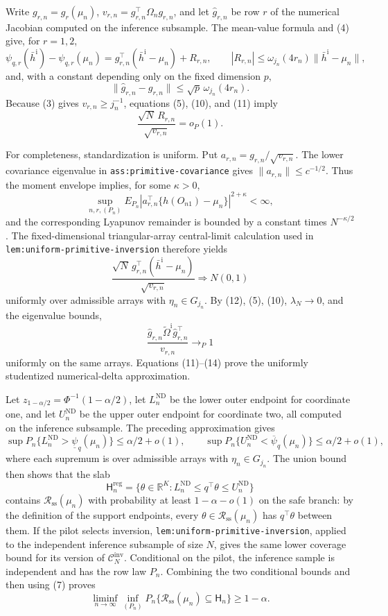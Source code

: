 Write \(g_{r,n}=g_r(\mu_n)\), \(v_{r,n}=g_{r,n}^\top\Omega_ng_{r,n}\), and let \(\widehat g_{r,n}\) be row \(r\) of the numerical Jacobian computed on the inference subsample.  The mean-value formula and (4) give, for \(r=1,2\),
\[
 \psi_{q,r}(\bar h^{\mathrm i})-\psi_{q,r}(\mu_n)
 =g_{r,n}^\top(\bar h^{\mathrm i}-\mu_n)+R_{r,n},
 \qquad
 |R_{r,n}|\le \omega_{j_n}(4r_n)\|\bar h^{\mathrm i}-\mu_n\|, \tag{11}
\]
and, with a constant depending only on the fixed dimension \(p\),
\[
 \|\widehat g_{r,n}-g_{r,n}\|
 \le \sqrt p\,\omega_{j_n}(4r_n). \tag{12}
\]
Because (3) gives \(v_{r,n}\ge j_n^{-1}\), equations (5), (10), and (11) imply
\[
 \frac{\sqrt N\,R_{r,n}}{\sqrt{v_{r,n}}}=o_P(1). \tag{13}
\]

For completeness, standardization is uniform.  Put \(a_{r,n}=g_{r,n}/\sqrt{v_{r,n}}\).  The lower covariance eigenvalue in \texttt{ass:primitive-covariance} gives \(\|a_{r,n}\|\le c^{-1/2}\).  Thus the moment envelope implies, for some \(\kappa>0\),
\[
 \sup_{n,r,(P_n)}E_{P_n}|a_{r,n}^\top\{h(O_{n1})-\mu_n\}|^{2+\kappa}<\infty,
\]
and the corresponding Lyapunov remainder is bounded by a constant times \(N^{-\kappa/2}\).  The fixed-dimensional triangular-array central-limit calculation used in \texttt{lem:uniform-primitive-inversion} therefore yields
\[
 \frac{\sqrt N\,g_{r,n}^\top(\bar h^{\mathrm i}-\mu_n)}{\sqrt{v_{r,n}}}
 \Rightarrow N(0,1)
\]
uniformly over admissible arrays with \(\eta_n\in G_{j_n}\).  By (12), (5), (10), \(\lambda_N\to0\), and the eigenvalue bounds,
\[
 \frac{\widehat g_{r,n}\widetilde\Omega^{\mathrm i}\widehat g_{r,n}^\top}{v_{r,n}}
 \to_P1 \tag{14}
\]
uniformly on the same arrays.  Equations (11)--(14) prove the uniformly studentized numerical-delta approximation.

Let \(z_{1-\alpha/2}=\Phi^{-1}(1-\alpha/2)\), let \(L_n^{\mathrm{ND}}\) be the lower outer endpoint for coordinate one, and let \(U_n^{\mathrm{ND}}\) be the upper outer endpoint for coordinate two, all computed on the inference subsample.  The preceding approximation gives
\[
 \sup P_n\{L_n^{\mathrm{ND}}>\underline\psi_q(\mu_n)\}
 \le \alpha/2+o(1),
 \qquad
 \sup P_n\{U_n^{\mathrm{ND}}<\overline\psi_q(\mu_n)\}
 \le \alpha/2+o(1), \tag{15}
\]
where each supremum is over admissible arrays with \(\eta_n\in G_{j_n}\).  The union bound then shows that the slab
\[
 \mathsf H_n^{\mathrm{reg}}
 =\{\theta\in\mathbb R^K:L_n^{\mathrm{ND}}\le q^\top\theta\le U_n^{\mathrm{ND}}\}
\]
contains \(\mathcal R_{\mathrm{ss}}(\mu_n)\) with probability at least \(1-\alpha-o(1)\) on the safe branch: by the definition of the support endpoints, every \(\theta\in\mathcal R_{\mathrm{ss}}(\mu_n)\) has \(q^\top\theta\) between them.  If the pilot selects inversion, \texttt{lem:uniform-primitive-inversion}, applied to the independent inference subsample of size \(N\), gives the same lower coverage bound for its version of \(\mathcal C_N^{\mathrm{inv}}\).  Conditional on the pilot, the inference sample is independent and has the row law \(P_n\).  Combining the two conditional bounds and then using (7) proves
\[
 \liminf_{n\to\infty}\inf_{(P_n)}
 P_n\{\mathcal R_{\mathrm{ss}}(\mu_n)\subseteq\mathsf H_n\}\ge1-\alpha. \tag{16}
\]

